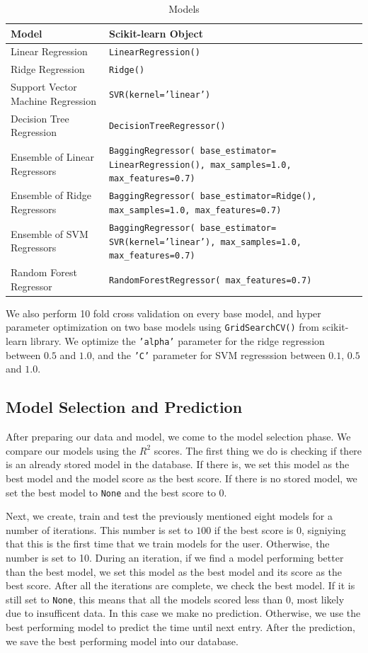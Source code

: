\begin{table}[htbp]
  \caption[Models]{Models}\label{tab:models}
  \centering
  \begin{tabular}{l|p{6cm}}
    Model&Scikit-learn Object\\ \toprule
    Linear Regression&\texttt{LinearRegression()}\\ \hline
    Ridge Regression&\texttt{Ridge()}\\ \hline
    Support Vector Machine Regression&\texttt{SVR(kernel='linear')}\\ \hline
    Decision Tree Regression&\texttt{DecisionTreeRegressor()}\\ \hline
    Ensemble of Linear Regressors&\texttt{BaggingRegressor( base\_estimator= LinearRegression(), max\_samples=1.0, max\_features=0.7)}\\ \hline
    Ensemble of Ridge Regressors &\texttt{BaggingRegressor( base\_estimator=Ridge(), max\_samples=1.0, max\_features=0.7)}\\ \hline
    Ensemble of SVM Regressors &\texttt{BaggingRegressor( base\_estimator= SVR(kernel='linear'), max\_samples=1.0, max\_features=0.7)}\\ \hline
    Random Forest Regressor&\texttt{RandomForestRegressor( max\_features=0.7)}\\ \hline
  \end{tabular}
\end{table}

We also perform 10 fold cross validation on every base model, and hyper parameter optimization on two base models using \texttt{GridSearchCV()} from scikit-learn library.
We optimize the \texttt{'alpha'} parameter for the ridge regression between $0.5$ and $1.0$, 
and the \texttt{'C'} parameter for SVM regresssion between $0.1$, $0.5$ and $1.0$.

\subsection{Model Selection and Prediction}
After preparing our data and model, we come to the model selection phase.
We compare our models using the $R^2$ scores.
The first thing we do is checking if there is an already stored model in the database.
If there is, we set this model as the best model and the model score as the best score.
If there is no stored model, we set the best model to \texttt{None} and the best score to $0$.

Next, we create, train and test the previously mentioned eight models for a number of iterations.
This number is set to $100$ if the best score is $0$, signiying that this is the first time that we train models for the user.
Otherwise, the number is set to 10.
During an iteration, if we find a model performing better than the best model, we set this model as the best model and its score as the best score.
After all the iterations are complete, we check the best model.
If it is still set to \texttt{None}, this means that all the models scored less than $0$, most likely due to insufficent data.
In this case we make no prediction.
Otherwise, we use the best performing model to predict the time until next entry.
After the prediction, we save the best performing model into our database.

